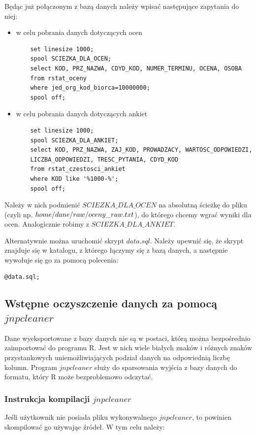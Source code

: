 \documentclass[]{article}
\begin{document}
Będąc już połączonym z bazą danych należy wpisać następujące zapytania do niej:
\begin{itemize}
	\item w celu pobrania danych dotyczących ocen
	\begin{verbatim}
	set linesize 1000;
	spool SCIEZKA_DLA_OCEN;
	select KOD, PRZ_NAZWA, CDYD_KOD, NUMER_TERMINU, OCENA, OSOBA
	from rstat_oceny
	where jed_org_kod_biorca=10000000;
	spool off;
	\end{verbatim}
	\item w celu pobrania danych dotyczących ankiet
	\begin{verbatim}
	set linesize 1000;
	spool SCIEZKA_DLA_ANKIET;
	select KOD, PRZ_NAZWA, ZAJ_KOD, PROWADZACY, WARTOSC_ODPOWIEDZI,
	LICZBA_ODPOWIEDZI, TRESC_PYTANIA, CDYD_KOD
	from rstat_czestosci_ankiet
	where KOD like '%1000-%';
	spool off;
	\end{verbatim}
\end{itemize}

Należy w nich podmienić $SCIEZKA\_DLA\_OCEN$ na absolutną ścieżkę do pliku (czyli np. $\/home/dane/raw/oceny\_raw.txt$), do którego chcemy wgrać wyniki dla ocen. Analogicznie robimy z $SCIEZKA\_DLA\_ANKIET$.

Alternatywnie można uruchomić skrypt $data.sql$. Należy upewnić się, że skrypt znajduje się w katalogu, z którego łączymy się z bazą danych, a następnie wywołuje się go za pomocą polecenia:
\begin{verbatim}
@data.sql;
\end{verbatim}

\subsection*{Wstępne oczyszczenie danych za pomocą $jnpcleaner$}

Dane wyeksportowane z bazy danych nie są w postaci, którą można bezpośrednio zaimportować do programu R. Jest w nich wiele białych znaków i różnych znaków przystankowych uniemożliwiających podział danych na odpowiednią liczbę kolumn. Program $jnpcleaner$ służy do sparsowania wyjścia z bazy danych do formatu, który R może bezproblemowo odczytać.


\subsubsection*{Instrukcja kompilacji $jnpcleaner$}
Jeśli użytkownik nie posiada pliku wykonywalnego $jnpcleaner$, to powinien skompilować go używając źródeł. W tym celu należy:
\end{document}
